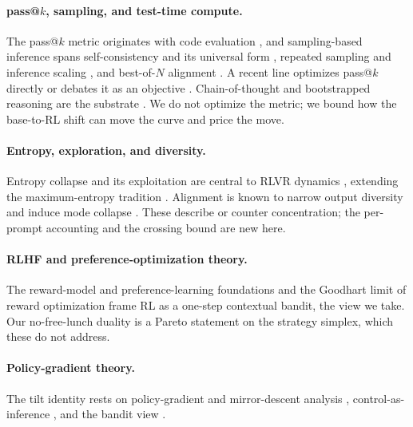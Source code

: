 \paragraph{pass@$k$, sampling, and test-time compute.}
The pass@$k$ metric originates with code evaluation \citep{chen2021codex}, and
sampling-based inference spans self-consistency and its universal form
\citep{wang2022selfconsistency,chen2023universalsc}, repeated sampling and
inference scaling \citep{brown2024monkeys,snell2024testtime,wu2024inferencescaling,muennighoff2025s1},
and best-of-$N$ alignment \citep{amini2024variationalbon,dong2023raft}. A recent
line optimizes pass@$k$ directly or debates it as an objective
\citep{walder2025passkppo,chen2025passktraining,yu2025passkdiagnostic,gui2025inferenceobj}.
Chain-of-thought and bootstrapped reasoning are the substrate
\citep{wei2022cot,zelikman2022star,yuan2023rft}. We do not optimize the metric;
we bound how the base-to-RL shift can move the curve and price the move.

\paragraph{Entropy, exploration, and diversity.}
Entropy collapse and its exploitation are central to RLVR dynamics
\citep{cui2025entropy,agarwal2025entropymin,wang2025entropytokens}, extending the
maximum-entropy tradition \citep{haarnoja2018sac}. Alignment is known to narrow
output diversity and induce mode collapse
\citep{kirk24diversity,mohammadi2024creativity,lanchantin2025divpo,zhang2025verbalized,jiang2025hivemind}.
These describe or counter concentration; the per-prompt accounting and the
crossing bound are new here.

\paragraph{RLHF and preference-optimization theory.}
The reward-model and preference-learning foundations
\citep{bradleyterry52,christiano17,stiennon20summarize,rafailov23dpo,azar24ipo,ethayarajh24kto,zhu23principled,munos24nash}
and the Goodhart limit of reward optimization \citep{gao23overopt} frame RL as a
one-step contextual bandit, the view we take. Our no-free-lunch duality is a
Pareto statement on the strategy simplex, which these do not address.

\paragraph{Policy-gradient theory.}
The tilt identity rests on policy-gradient and mirror-descent analysis
\citep{sutton99pg,kakade01npg,agarwal21pgtheory,tomar22mdpo,mei20softmax,schulman15trpo},
control-as-inference \citep{levine18control}, and the bandit view
\citep{lattimore20bandit}.

